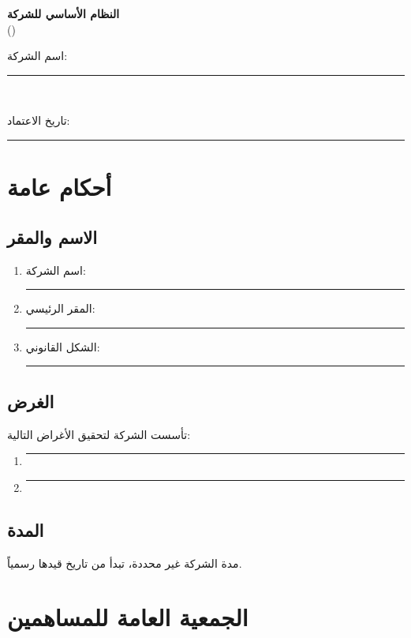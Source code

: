 \documentclass[12pt,a4paper]{article}
\begin{document}
\begin{center}
{\LARGE\bfseries النظام الأساسي للشركة}\\[0.5em]
{\large ()}\\[1em]
{\normalsize اسم الشركة: \rule{6cm}{0.4pt}}\\[0.3em]
{\normalsize تاريخ الاعتماد: \rule{4cm}{0.4pt}}
\end{center}

\vspace{1.5em}

\section{أحكام عامة}
\label{ch:general}

\subsection{الاسم والمقر}
\begin{enumerate}
    \item اسم الشركة: \rule{6cm}{0.4pt}
    \item المقر الرئيسي: \rule{8cm}{0.4pt}
    \item الشكل القانوني: \rule{4cm}{0.4pt}
\end{enumerate}

\subsection{الغرض}
تأسست الشركة لتحقيق الأغراض التالية:
\begin{enumerate}
    \item \rule{12cm}{0.4pt}
    \item \rule{12cm}{0.4pt}
\end{enumerate}

\subsection{المدة}
مدة الشركة غير محددة، تبدأ من تاريخ قيدها رسمياً.

\section{الجمعية العامة للمساهمين}
\label{ch:shareholders}
\end{document}
